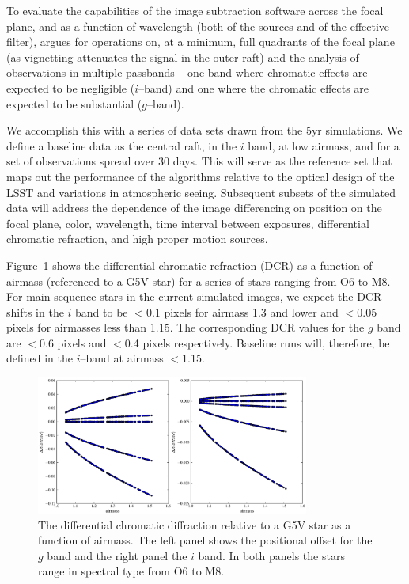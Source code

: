 \documentclass[prd, nofootinbib, floatfix, 11pt,tightenlines,times]{article}
\begin{document}
To evaluate the capabilities of the image subtraction software across
the focal plane, and as a function of wavelength (both of the sources
and of the effective filter), argues for operations on, at a minimum,
full quadrants of the focal plane (as vignetting attenuates the signal
in the outer raft) and the analysis of observations in multiple
passbands -- one band where chromatic effects are expected to be
negligible ($i$--band) and one where the chromatic effects are
expected to be substantial ($g$--band).

We accomplish this with a series of data sets drawn from the 5yr
simulations. We define a baseline data as the central raft, in the $i$
band, at low airmass, and for a set of observations spread
over 30 days.  This will serve as the reference set that maps out the
performance of the algorithms relative to the optical design of the
LSST and variations in atmospheric seeing. Subsequent subsets of the
simulated data will address the dependence of the image differencing
on position on the focal plane, color, wavelength, time interval
between exposures, differential chromatic refraction, and high proper
motion sources. 

Figure~\ref{DCR} shows the differential chromatic refraction (DCR) as
a function of airmass (referenced to a G5V star) for a series of stars
ranging from O6 to M8. For main sequence stars in the current
simulated images, we expect the DCR shifts in the $i$ band to be
$<$0.1 pixels for airmass 1.3 and lower and $<$0.05 pixels for
airmasses less than 1.15. The corresponding DCR values for the $g$
band are $<$0.6 pixels and $<$0.4 pixels respectively. Baseline runs
will, therefore, be defined in the $i$--band at airmass $<$1.15.

\begin{figure}
\centerline{\includegraphics[width=0.8\textwidth]{Figures/DCR_R_stars.eps}}
\caption{The differential chromatic diffraction relative to a G5V star
  as a function of airmass. The left panel shows the positional offset
  for the $g$ band and the right panel the $i$ band. In both panels
  the stars range in spectral type from O6 to M8.}
\label{DCR}
\end{figure}
\end{document}
